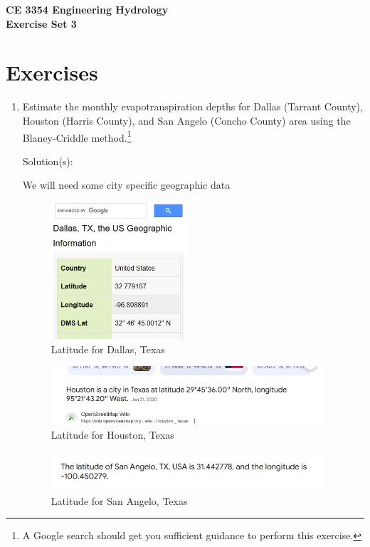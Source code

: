 \documentclass[12pt]{article}
\begin{document}
\begin{center}
{\textbf{{ CE 3354 Engineering Hydrology} \\ {Exercise Set 3}}}
\end{center}

 \section*{\small{Exercises}}
 \begin{enumerate}

\item Estimate the monthly evapotranspiration depths for Dallas (Tarrant County), Houston (Harris County), and San Angelo (Concho County) area using the Blaney-Criddle method.\footnote{A Google search should get you sufficient guidance to perform this exercise.}

Solution(s):

We will need some city specific geographic data

\begin{figure}[h!] %
   \centering
   \includegraphics[height=2in]{dallaslatitude.png} 
   \caption{Latitude for Dallas, Texas}
   \label{fig:dallas-lat}
\end{figure}
\begin{figure}[h!] %
   \centering
   \includegraphics[width=4in]{houstonlatitude.png} 
   \caption{Latitude for Houston, Texas}
   \label{fig:houston-lat}
\end{figure}
\begin{figure}[h!] %
   \centering
   \includegraphics[width=4in]{sanangelolat.png} 
   \caption{Latitude for San Angelo, Texas}
   \label{fig:sanangelo-lat}
\end{figure}


\end{enumerate}
\end{document}
